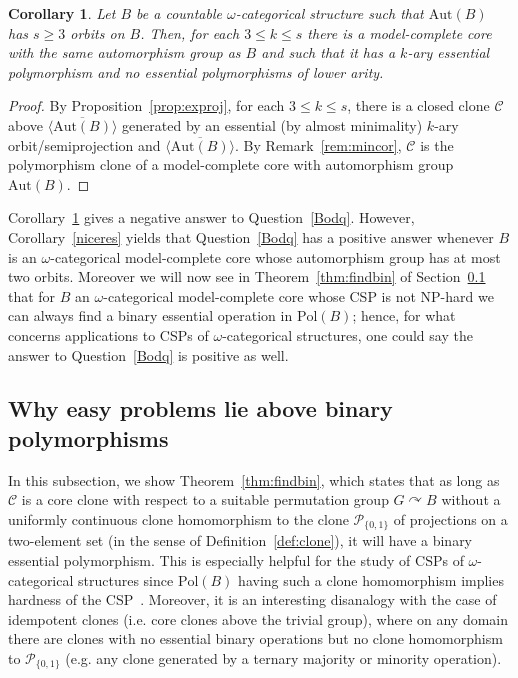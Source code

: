 \documentclass{article}
\newtheorem{corollary}[theorem]{Corollary}
\theoremstyle{remark}
\theoremstyle{definition}
\def\acts{\curvearrowright}
\begin{document}
\begin{corollary}\label{cor:counterex} Let $B$ be a countable $\omega$-categorical structure such that $\mathrm{Aut}(B)$ has $s\geq 3$ orbits on $B$. Then, for each $3\leq k\leq s$ there is a model-complete core with the same automorphism group as $B$ and such that it has a $k$-ary essential polymorphism and no essential polymorphisms of lower arity.
\end{corollary}
\begin{proof} By Proposition~\ref{prop:exproj}, for each $3\leq k\leq s$, there is a closed clone $\mathcal{C}$ above $\overline{\langle\mathrm{Aut}(B)\rangle}$ generated by an essential (by almost minimality) $k$-ary orbit\-/semiprojection and $\overline{\langle\mathrm{Aut}(B)\rangle}$. By Remark~\ref{rem:mincor}, $\mathcal{C}$ is the polymorphism clone of a model-complete core with automorphism group $\mathrm{Aut}(B)$.
\end{proof}

Corollary~\ref{cor:counterex} gives a negative answer to 
Question~\ref{Bodq}. However, Corollary~\ref{niceres} yields that Question~\ref{Bodq} has a positive answer whenever $B$ is an $\omega$-categorical model-complete core whose automorphism group has at most two orbits. Moreover we will now see  in Theorem~\ref{thm:findbin} of Section~\ref{whyeasybin} that for $B$ an $\omega$-categorical model-complete core whose CSP is not NP-hard we can always find a binary essential operation in $\mathrm{Pol}(B)$; hence, for what concerns applications to CSPs of $\omega$-categorical structures, one could say the answer to Question~\ref{Bodq} is positive as well.






\subsection{Why easy problems lie above binary polymorphisms}\label{whyeasybin}
In this subsection, we show Theorem~\ref{thm:findbin}, which states that as long as $\mathcal{C}$ is a core clone with respect to a suitable permutation group $G\acts B$ without a uniformly continuous clone homomorphism to the clone $\mathcal{P}_{\{0,1\}}$ of projections on a two-element set (in the sense of Definition~\ref{def:clone}), it will have a binary essential polymorphism. This is especially helpful for the study of $\mathrm{CSP}$s of $\omega$-categorical structures since $\mathrm{Pol}(B)$ having such a clone homomorphism implies hardness of the CSP~\cite{Topo-Birk}. Moreover, it is an interesting disanalogy with the case of idempotent clones (i.e. core clones above the trivial group), where on any domain there are clones with no essential binary operations but no clone homomorphism to $\mathcal{P}_{\{0,1\}}$  (e.g. any clone generated by a  ternary majority or minority operation).\\
\end{document}
